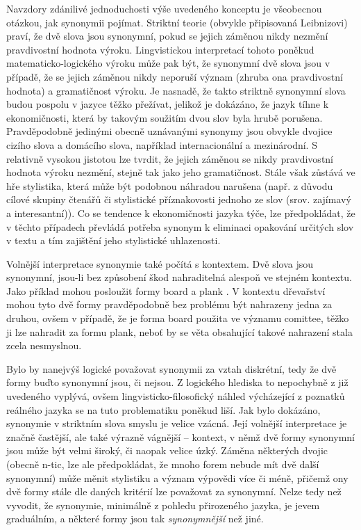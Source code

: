 \documentclass[a4paper, 11pt, oneside]{book}
\newcommand{\td}[2][]{
	{\todo[size=\footnotesize]{#2}}
}
\newcommand\ex{\textsf}
\begin{document}
					Navzdory zdánilivé jednoduchosti výše uvedeného konceptu je všeobecnou otázkou, jak synonymii pojímat. Striktní teorie (obvykle připisovaná Leibnizovi) praví, že dvě slova jsou synonymní, pokud se jejich záměnou nikdy nezmění pravdivostní hodnota výroku. Lingvistickou interpretací tohoto poněkud matematicko-logického výroku může pak být, že synonymní dvě slova jsou v případě, že se jejich záměnou nikdy neporuší význam (zhruba ona pravdivostní hodnota) a gramatičnost výroku. Je nasnadě, že takto striktně synonymní slova budou pospolu v jazyce těžko přežívat, jelikož je dokázáno, že jazyk tíhne k ekonomičnosti, která by takovým soužitím dvou slov byla hrubě porušena. Pravděpodobně jedinými obecně uznávanými synonymy jsou obvykle dvojice cizího slova a domácího slova, například \ex{internacionální} a \ex{mezinárodní}. S relativně vysokou jistotou lze tvrdit, že jejich záměnou se nikdy pravdivostní hodnota výroku nezmění, stejně tak jako jeho gramatičnost. Stále však zůstává ve hře stylistika, která může být podobnou náhradou narušena (např. z důvodu cílové skupiny čtenářů či stylistické příznakovosti jednoho ze slov (srov. \ex{zajímavý} a \ex{interesantní})). Co se tendence k ekonomičnosti jazyka týče, lze předpokládat, že v těchto případech převládá potřeba synonym k eliminaci opakování určitých slov v textu a tím zajištění jeho stylistické uhlazenosti. 

					Volnější interpretace synonymie také počítá s kontextem. Dvě slova jsou synonymní, jsou-li bez způsobení škod nahraditelná alespoň ve stejném kontextu. Jako příklad mohou posloužit formy \ex{board} a \ex{plank}\td{najit ceske priklady}. V kontextu dřevařství mohou tyto dvě formy pravděpodobně bez problému být nahrazeny jedna za druhou, ovšem v případě, že je forma \ex{board} použita ve významu \ex{comittee}, těžko ji lze nahradit za formu \ex{plank}, neboť by se věta obsahující takové nahrazení stala zcela nesmyslnou.

					Bylo by nanejvýš logické považovat synonymii za vztah diskrétní, tedy že dvě formy buďto synonymní jsou, či nejsou. Z logického hlediska to nepochybně z již uvedeného vyplývá, ovšem lingvisticko-filosofický náhled výcházející z poznatků reálného jazyka se na tuto problematiku poněkud liší. Jak bylo dokázáno, synonymie v striktním slova smyslu je velice vzácná. Její volnější interpretace je značně častější, ale také výrazně vágnější -- kontext, v němž dvě formy synonymní jsou může být velmi široký, či naopak velice úzký. Záměna některých dvojic (obecně n-tic, lze ale předpokládat, že mnoho forem nebude mít dvě další synonymní) může měnit stylistiku a význam výpovědi více či méně, přičemž ony dvě formy stále dle daných kritérií lze považovat za synonymní. Nelze tedy než vyvodit, že synonymie, minimálně z pohledu přirozeného jazyka, je jevem graduálním, a některé formy jsou tak \textit{synonymnější} než jiné.
\end{document}
